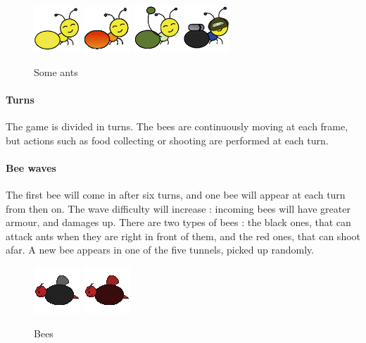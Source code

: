 \documentclass[a4paper]{article}
\begin{document}
\begin{figure}[H]
	\center
	\includegraphics[scale=0.5]{ant_harvester.png}
	\includegraphics[scale=0.5]{ant_fire.png}
	\includegraphics[scale=0.5]{ant_longthrower.png}
	\includegraphics[scale=0.5]{ant_scuba.png}
	\caption{Some ants}
	\label{someants}
\end{figure}

\paragraph{Turns} The game is divided in turns. The bees are continuously moving at each frame, but actions such as food collecting or shooting are performed at each turn.

\paragraph{Bee waves} The first bee will come in after six turns, and one bee will appear at each turn from then on. The wave difficulty will increase : incoming bees will have greater armour, and damages up. There are two types of bees : the black ones, that can attack ants when they are right in front of them, and the red ones, that can shoot afar. A new bee appears in one of the five tunnels, picked up randomly.

\begin{figure}[H]
	\center
	\includegraphics[scale=0.5]{bee.png}
	\includegraphics[scale=0.5]{rangebee.png}
	\caption{Bees}
	\label{bees}
\end{figure}
\end{document}

